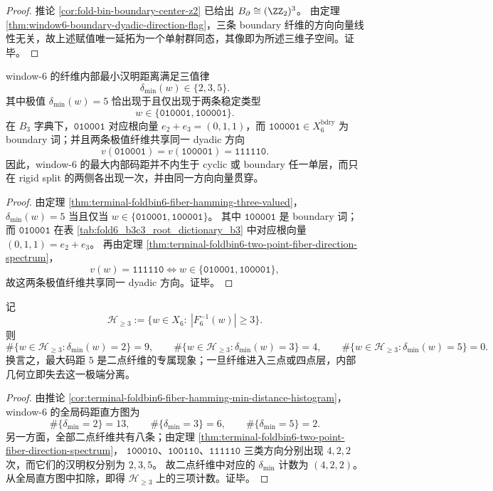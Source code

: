 \begin{proof}
推论 \ref{cor:fold-bin-boundary-center-z2} 已给出
\(
B_{\partial}\cong(\ZZ_2)^3
\)。
由定理 \ref{thm:window6-boundary-dyadic-direction-flag}，三条 boundary 纤维的方向向量线性无关，故上述赋值唯一延拓为一个单射群同态，其像即为所述三维子空间。证毕。
\end{proof}

\begin{theorem}\label{thm:window6-split-extremal-distance-bridge}
window-\(6\) 的纤维内部最小汉明距离满足三值律
\[
\delta_{\min}(w)\in\{2,3,5\}.
\]
其中极值 \(\delta_{\min}(w)=5\) 恰出现于且仅出现于两条稳定类型
\[
w\in\{\texttt{010001},\texttt{100001}\}.
\]
在 \(B_3\) 字典下，\(\texttt{010001}\) 对应根向量 \(e_2+e_3=(0,1,1)\)，而 \(\texttt{100001}\in X_6^{\mathrm{bdry}}\) 为 boundary 词；并且两条极值纤维共享同一 dyadic 方向
\[
v(\texttt{010001})=v(\texttt{100001})=\texttt{111110}.
\]
因此，window-\(6\) 的最大内部码距并不内生于 cyclic 或 boundary 任一单层，而只在 rigid split 的两侧各出现一次，并由同一方向向量贯穿。
\end{theorem}

\begin{proof}
由定理 \ref{thm:terminal-foldbin6-fiber-hamming-three-valued}，
\(
\delta_{\min}(w)=5
\)
当且仅当
\(
w\in\{\texttt{010001},\texttt{100001}\}
\)。
其中 \(\texttt{100001}\) 是 boundary 词；
而 \(\texttt{010001}\) 在表 \ref{tab:fold6_b3c3_root_dictionary_b3} 中对应根向量 \((0,1,1)=e_2+e_3\)。
再由定理 \ref{thm:terminal-foldbin6-two-point-fiber-direction-spectrum}，
\[
v(w)=\texttt{111110}
\iff
w\in\{\texttt{010001},\texttt{100001}\},
\]
故这两条极值纤维共享同一 dyadic 方向。证毕。
\end{proof}

\begin{corollary}[高重纤维的极值排斥]\label{cor:window6-heavy-fiber-no-max-distance}
记
\[
\mathcal H_{\ge 3}:=\{w\in X_6:\ |F_6^{-1}(w)|\ge 3\}.
\]
则
\[
\#\{w\in \mathcal H_{\ge 3}:\delta_{\min}(w)=2\}=9,\qquad
\#\{w\in \mathcal H_{\ge 3}:\delta_{\min}(w)=3\}=4,\qquad
\#\{w\in \mathcal H_{\ge 3}:\delta_{\min}(w)=5\}=0.
\]
换言之，最大码距 \(5\) 是二点纤维的专属现象；一旦纤维进入三点或四点层，内部几何立即失去这一极端分离。
\end{corollary}

\begin{proof}
由推论 \ref{cor:terminal-foldbin6-fiber-hamming-min-distance-histogram}，
window-\(6\) 的全局码距直方图为
\[
\#\{\delta_{\min}=2\}=13,\qquad
\#\{\delta_{\min}=3\}=6,\qquad
\#\{\delta_{\min}=5\}=2.
\]
另一方面，全部二点纤维共有八条；由定理 \ref{thm:terminal-foldbin6-two-point-fiber-direction-spectrum}，
\(\texttt{100010}\)、\(\texttt{100110}\)、\(\texttt{111110}\) 三类方向分别出现 \(4,2,2\) 次，而它们的汉明权分别为 \(2,3,5\)。
故二点纤维中对应的 \(\delta_{\min}\) 计数为 \((4,2,2)\)。
从全局直方图中扣除，即得 \(\mathcal H_{\ge 3}\) 上的三项计数。证毕。
\end{proof}

